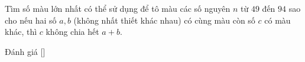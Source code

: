 \ifshowproblem
\begin{problem}\label{problem:THA-2015-TSTST-E-P3}
    Tìm số màu lớn nhất có thể sử dụng để tô màu các số nguyên \( n \) từ \( 49 \) đến \( 94 \)
    sao cho nếu hai số \( a, b \) (không nhất thiết khác nhau) có cùng màu còn số \( c \) có màu khác, thì \( c \) không chia hết \( a + b \).
\end{problem}
\fi

\ifshowinfo
Đánh giá [\textbf{}]\footnotemark
{}
\fi